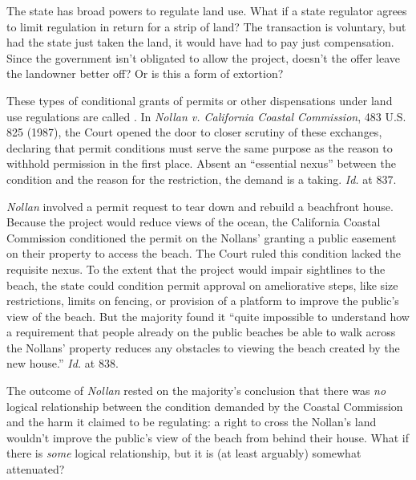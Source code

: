 The state has broad powers to regulate land use. What if a state regulator
agrees to limit regulation in return for a strip of land? The transaction is
voluntary, but had the state just taken the land, it would have had to pay just
compensation. Since the government isn't obligated to allow the project, doesn't
the offer leave the landowner better off? Or is this a form of extortion? 

These types of conditional grants of permits or other dispensations under land
use regulations are called . In \textit{Nollan v.
California
Coastal Commission}, 483 U.S. 825 (1987), the Court opened the door to closer
scrutiny of these exchanges, declaring that permit conditions must serve the
same purpose as the reason to withhold permission in the first place. Absent an
``essential nexus'' between the condition and the reason for the restriction,
the demand is a taking. \textit{Id.} at 837. 

\textit{Nollan} involved a permit request to tear down and rebuild a beachfront
house. Because the project would reduce views of the ocean, the California
Coastal Commission conditioned the permit on the Nollans' granting a public
easement on their property to access the beach. The Court ruled this condition
lacked the requisite nexus. To the extent that the project would impair
sightlines to the beach, the state could condition permit approval on
ameliorative steps, like size restrictions, limits on fencing, or provision of a
platform to improve the public's view of the beach. But the majority found it
``quite impossible to understand how a requirement that people already on the
public beaches be able to walk across the Nollans' property reduces any
obstacles to viewing the beach created by the new house.'' \textit{Id.} at 838.

The outcome of \textit{Nollan} rested on the majority's conclusion that there
was \textit{no} logical relationship between the condition demanded by the
Coastal Commission and the harm it claimed to be regulating: a right to cross
the Nollan's land wouldn't improve the public's view of the beach from behind
their house. What if there is \textit{some} logical relationship, but it is (at
least arguably) somewhat attenuated?

